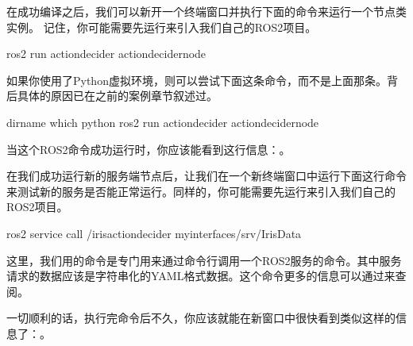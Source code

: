 \documentclass[letterpaper,10pt,english]{sphinxmanual}
\begin{document}
\sphinxAtStartPar
在成功编译之后，我们可以新开一个终端窗口并执行下面的命令来运行一个节点类实例。
记住，你可能需要先运行来引入我们自己的ROS2项目。

\begin{sphinxVerbatim}[commandchars=\\\{\}]
ros2 run action\PYGZus{}decider action\PYGZus{}decider\PYGZus{}node
\end{sphinxVerbatim}

\sphinxAtStartPar
如果你使用了Python虚拟环境，则可以尝试下面这条命令，而不是上面那条。背后具体的原因已在之前的案例章节叙述过。

\begin{sphinxVerbatim}[commandchars=\\\{\}]
dirname which python ros2 run action\PYGZus{}decider action\PYGZus{}decider\PYGZus{}node
\end{sphinxVerbatim}

\sphinxAtStartPar
当这个ROS2命令成功运行时，你应该能看到这行信息：。

\sphinxAtStartPar
在我们成功运行新的服务端节点后，让我们在一个新终端窗口中运行下面这行命令来测试新的服务是否能正常运行。同样的，你可能需要先运行来引入我们自己的ROS2项目。

\begin{sphinxVerbatim}[commandchars=\\\{\}]
ros2 service call /iris\PYGZus{}action\PYGZus{}decider my\PYGZus{}interfaces/srv/IrisData 
\end{sphinxVerbatim}

\sphinxAtStartPar
这里，我们用的命令是专门用来通过命令行调用一个ROS2服务的命令。其中服务请求的数据应该是字符串化的YAML格式数据。这个命令更多的信息可以通过来查阅。

\sphinxAtStartPar
一切顺利的话，执行完命令后不久，你应该就能在新窗口中很快看到类似这样的信息了：。
\end{document}
